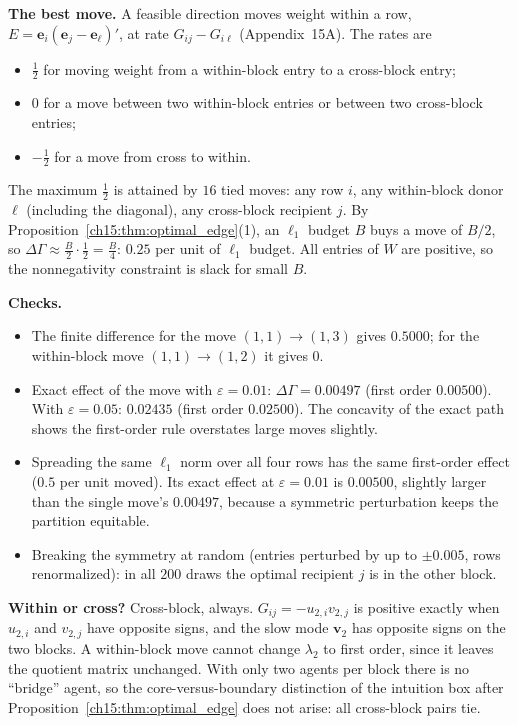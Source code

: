 \documentclass[../solutions_manual.tex]{subfiles}
\begin{document}
 \textbf{The best move.} A feasible direction moves weight within a row, $E = \mathbf{e}_i(\mathbf{e}_j - \mathbf{e}_\ell)'$, at rate $G_{ij} - G_{i\ell}$ (Appendix~15A). The rates are
\begin{itemize}
\item $\frac12$ for moving weight from a within-block entry to a cross-block entry;
\item $0$ for a move between two within-block entries or between two cross-block entries;
\item $-\frac12$ for a move from cross to within.
\end{itemize}
The maximum $\frac12$ is attained by $16$ tied moves: any row $i$, any within-block donor $\ell$ (including the diagonal), any cross-block recipient $j$. By Proposition~\ref{ch15:thm:optimal_edge}(1), an $\ell_1$ budget $B$ buys a move of $B/2$, so $\Delta\Gamma \approx \frac{B}{2}\cdot\frac12 = \frac{B}{4}$: $0.25$ per unit of $\ell_1$ budget. All entries of $W$ are positive, so the nonnegativity constraint is slack for small $B$.

\textbf{Checks.}
\begin{itemize}
\item The finite difference for the move $(1,1) \to (1,3)$ gives $0.5000$; for the within-block move $(1,1) \to (1,2)$ it gives $0$.
\item Exact effect of the move with $\varepsilon = 0.01$: $\Delta\Gamma = 0.00497$ (first order $0.00500$). With $\varepsilon = 0.05$: $0.02435$ (first order $0.02500$). The concavity of the exact path shows the first-order rule overstates large moves slightly.
\item Spreading the same $\ell_1$ norm over all four rows has the same first-order effect ($0.5$ per unit moved). Its exact effect at $\varepsilon = 0.01$ is $0.00500$, slightly larger than the single move's $0.00497$, because a symmetric perturbation keeps the partition equitable.
\item Breaking the symmetry at random (entries perturbed by up to $\pm 0.005$, rows renormalized): in all $200$ draws the optimal recipient $j$ is in the other block.
\end{itemize}

 \textbf{Within or cross?} Cross-block, always. $G_{ij} = -u_{2,i}v_{2,j}$ is positive exactly when $u_{2,i}$ and $v_{2,j}$ have opposite signs, and the slow mode $\mathbf{v}_2$ has opposite signs on the two blocks. A within-block move cannot change $\lambda_2$ to first order, since it leaves the quotient matrix unchanged. With only two agents per block there is no ``bridge'' agent, so the core-versus-boundary distinction of the intuition box after Proposition~\ref{ch15:thm:optimal_edge} does not arise: all cross-block pairs tie.
\end{document}
